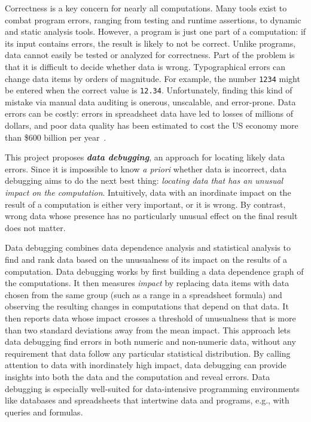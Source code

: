 \projectname{}

Correctness is a key concern for nearly all computations. Many tools
exist to combat program errors, ranging from testing and runtime
assertions, to dynamic and static analysis tools. However, a program
is just one part of a computation: if its input contains errors, the
result is likely to not be correct. Unlike programs, data cannot
easily be tested or analyzed for correctness.  Part of the problem is
that it is difficult to decide whether data is wrong. Typographical errors can change data items by
orders of magnitude. For example, the
number \texttt{1234} might be entered when the correct value is \texttt{12.34}. Unfortunately, finding this kind of mistake via
manual data auditing is onerous, unscalable, and error-prone. Data
errors can be costly: errors in spreadsheet data have led to losses of
millions of dollars, and poor data quality has been estimated to cost
the US economy more than \$600 billion per year~\cite{eckerson2002}.

This project proposes \emph{\bf data debugging}, an approach for
locating likely data errors. Since it is impossible to know \emph{a
priori} whether data is incorrect, data debugging aims to do
the next best thing: \emph{locating data that has an unusual impact on
the computation}. Intuitively, data with an inordinate impact on
the result of a computation is either very important, or it is wrong. By
contrast, wrong data whose presence has no particularly unusual effect
on the final result does not matter.

Data debugging combines data dependence analysis and statistical
analysis to find and rank data based on the unusualness of its impact
on the results of a computation. Data debugging works by first
building a data dependence graph of the computations. It then measures
\emph{impact} by replacing data items with data chosen from the same
group (such as a range in a spreadsheet formula) and observing the
resulting changes in computations that depend on that data. It then reports data whose impact crosses a threshold of
unusualness that is more than two standard deviations away from the
mean impact. This
approach lets data debugging find errors in both
numeric and non-numeric data, without any requirement that data follow
any particular statistical distribution.
By calling attention to data with inordinately high impact, data debugging can
provide insights into both the data and the computation and reveal
errors. Data debugging is especially well-suited for data-intensive
programming environments like databases and spreadsheets that
intertwine data and programs, e.g., with queries and formulas.

